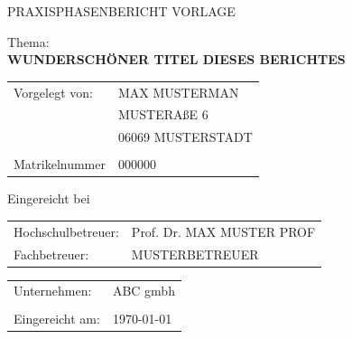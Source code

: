 \begin{titlepage}
  \thispagestyle{titlepage}
  \begin{center}
    \vspace*{0.5cm}
    \LARGE{PRAXISPHASENBERICHT VORLAGE}
    \vspace{1cm}
  \end{center}
  \vspace*{1.5cm}
  \noindent \large{Thema:} \\
  \noindent\Large{\textbf{WUNDERSCHÖNER TITEL DIESES BERICHTES}} 
  \vspace{1.5cm}

  \normalsize
  \noindent\begin{tabular}{@{}p{3.2cm} l@{}}
    Vorgelegt von: & MAX MUSTERMAN  \\
                   & MUSTERAßE 6 \\
                   & 06069 MUSTERSTADT \\ 
                   & \\
    Matrikelnummer & 000000 
  \end{tabular}
  \vspace{1cm}

  \noindent Eingereicht bei\\
  \noindent\begin{tabular}{@{}p{3.2cm} l@{}}
    Hochschulbetreuer: & Prof. Dr. MAX MUSTER PROF \\
    Fachbetreuer: & MUSTERBETREUER  \\
  \end{tabular}
  \vspace{1cm}
  
  \noindent\begin{tabular}{@{}p{3.2cm} l@{}}
    Unternehmen: & ABC gmbh \\
                 & \\
    Eingereicht am: & \today{} \\
  \end{tabular}



\end{titlepage}